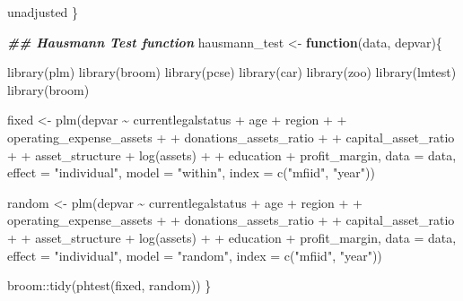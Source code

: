 \documentclass[a4paper,nobind]{templates/ociamthesis}
\newenvironment{Shaded}{\begin{snugshade}}{\end{snugshade}}
\newcommand{\AttributeTok}[1]{\textcolor[rgb]{0.77,0.63,0.00}{#1}}
\newcommand{\ControlFlowTok}[1]{\textcolor[rgb]{0.13,0.29,0.53}{\textbf{#1}}}
\newcommand{\DocumentationTok}[1]{\textcolor[rgb]{0.56,0.35,0.01}{\textbf{\textit{#1}}}}
\newcommand{\FunctionTok}[1]{\textcolor[rgb]{0.00,0.00,0.00}{#1}}
\newcommand{\NormalTok}[1]{#1}
\newcommand{\OtherTok}[1]{\textcolor[rgb]{0.56,0.35,0.01}{#1}}
\newcommand{\SpecialCharTok}[1]{\textcolor[rgb]{0.00,0.00,0.00}{#1}}
\newcommand{\StringTok}[1]{\textcolor[rgb]{0.31,0.60,0.02}{#1}}
\renewenvironment{Shaded}
{
  \vspace{10pt}%
  \begin{snugshade}%
}{%
  \end{snugshade}%
  \vspace{8pt}%
}
\begin{document}
\begin{Shaded}
\begin{Highlighting}[]
\NormalTok{unadjusted}
\NormalTok{\}}
\end{Highlighting}
\end{Shaded}

\begin{Shaded}
\begin{Highlighting}[]
\DocumentationTok{\#\# Hausmann Test function}
\NormalTok{hausmann\_test }\OtherTok{\textless{}{-}} \ControlFlowTok{function}\NormalTok{(data, depvar)\{}
  
  \FunctionTok{library}\NormalTok{(plm)}
  \FunctionTok{library}\NormalTok{(broom)}
  \FunctionTok{library}\NormalTok{(pcse)}
  \FunctionTok{library}\NormalTok{(car)}
  \FunctionTok{library}\NormalTok{(zoo)}
  \FunctionTok{library}\NormalTok{(lmtest)}
  \FunctionTok{library}\NormalTok{(broom)}
  
\NormalTok{  fixed }\OtherTok{\textless{}{-}} \FunctionTok{plm}\NormalTok{(depvar }\SpecialCharTok{\textasciitilde{}}\NormalTok{ currentlegalstatus }\SpecialCharTok{+}\NormalTok{ age }\SpecialCharTok{+}\NormalTok{ region }\SpecialCharTok{+}
\SpecialCharTok{+}\NormalTok{           operating\_expense\_assets }\SpecialCharTok{+} 
\SpecialCharTok{+}\NormalTok{           donations\_assets\_ratio }\SpecialCharTok{+} 
\SpecialCharTok{+}\NormalTok{           capital\_asset\_ratio }\SpecialCharTok{+}
\SpecialCharTok{+}\NormalTok{           asset\_structure }\SpecialCharTok{+} \FunctionTok{log}\NormalTok{(assets) }\SpecialCharTok{+} 
\SpecialCharTok{+}\NormalTok{           education }\SpecialCharTok{+}\NormalTok{ profit\_margin, }
               \AttributeTok{data =}\NormalTok{ data, }\AttributeTok{effect =} \StringTok{"individual"}\NormalTok{, }\AttributeTok{model =} \StringTok{"within"}\NormalTok{, }
      \AttributeTok{index =} \FunctionTok{c}\NormalTok{(}\StringTok{"mfiid"}\NormalTok{, }\StringTok{"year"}\NormalTok{)) }
  
\NormalTok{  random }\OtherTok{\textless{}{-}} \FunctionTok{plm}\NormalTok{(depvar }\SpecialCharTok{\textasciitilde{}}\NormalTok{ currentlegalstatus }\SpecialCharTok{+}\NormalTok{ age }\SpecialCharTok{+}\NormalTok{ region }\SpecialCharTok{+}
\SpecialCharTok{+}\NormalTok{           operating\_expense\_assets }\SpecialCharTok{+} 
\SpecialCharTok{+}\NormalTok{           donations\_assets\_ratio }\SpecialCharTok{+} 
\SpecialCharTok{+}\NormalTok{           capital\_asset\_ratio }\SpecialCharTok{+}
\SpecialCharTok{+}\NormalTok{           asset\_structure }\SpecialCharTok{+} \FunctionTok{log}\NormalTok{(assets) }\SpecialCharTok{+} 
\SpecialCharTok{+}\NormalTok{           education }\SpecialCharTok{+}\NormalTok{ profit\_margin, }
          \AttributeTok{data =}\NormalTok{ data, }\AttributeTok{effect =} \StringTok{"individual"}\NormalTok{, }\AttributeTok{model =} \StringTok{"random"}\NormalTok{, }
      \AttributeTok{index =} \FunctionTok{c}\NormalTok{(}\StringTok{"mfiid"}\NormalTok{, }\StringTok{"year"}\NormalTok{))}
 
\NormalTok{  broom}\SpecialCharTok{::}\FunctionTok{tidy}\NormalTok{(}\FunctionTok{phtest}\NormalTok{(fixed, random))}
\NormalTok{\}}
\end{Highlighting}
\end{Shaded}
\end{document}
